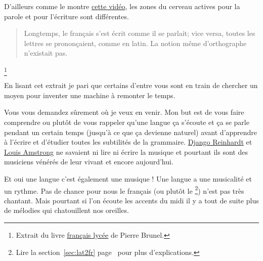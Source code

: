D'ailleurs comme le montre \href{https://youtu.be/Wn\_eBrIDUuc}{cette vidéo}, les zones du cerveau actives
pour la parole et pour l'écriture sont différentes.\par

\begin{quote}
Longtemps, le français s'est écrit comme il se parlait; vice versa,
toutes les lettres se prononçaient, comme en latin. La notion même
d'orthographe n'existait pas.
\end{quote}\footnote{Extrait du livre
\href{https://www.amazon.fr/gp/product/2844100015/ref=as\_li\_tl?ie=UTF8\&camp=1642\&creative=6746\&creativeASIN=2844100015\&linkCode=as2\&tag=wwwbecomefree-21\&linkId=985f3a849fd44728e8480993cf2d5490}{français
  lycée} de Pierre Brunel.}


En lisant cet extrait je pari que certains d'entre vous sont en train
de chercher un moyen pour inventer une machine à remonter le temps. 

Vous vous demandez sûrement où je veux en venir. Mon but est de vous
faire comprendre ou plutôt de vous rappeler qu'une langue ça s'écoute
et ça se parle pendant un certain temps (jusqu'à ce que ça devienne
naturel) avant d'apprendre à l'écrire et d'étudier toutes les
subtilités de la grammaire. \href{https://fr.wikipedia.org/wiki/Django\_Reinhardt}{Django Reinhardt} et \href{https://fr.wikipedia.org/wiki/Louis\_Armstrong}{Louis Amstrong} ne
savaient ni lire ni écrire la musique et pourtant ils sont des
musiciens vénérés de leur vivant et encore aujourd'hui.\par

Et oui une langue c'est également une musique ! Une langue a une
musicalité et un rythme. Pas de chance pour nous le français (ou
plutôt le \footnote{Lire la section~\ref{sec:lat2fr}
  page~\pageref{sec:lat2fr} pour plus d'explications.})
n'est pas très chantant. Mais pourtant si l'on écoute les accents du
midi il y a tout de suite plus de mélodies qui chatouillent nos
oreilles. 

